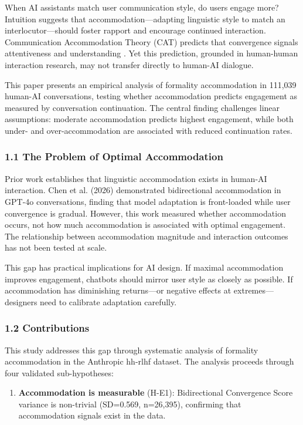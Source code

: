 
When AI assistants match user communication style, do users engage more? Intuition suggests that accommodation---adapting linguistic style to match an interlocutor---should foster rapport and encourage continued interaction. Communication Accommodation Theory (CAT) predicts that convergence signals attentiveness and understanding \citep{giles1973accommodation}. Yet this prediction, grounded in human-human interaction research, may not transfer directly to human-AI dialogue.

This paper presents an empirical analysis of formality accommodation in 111,039 human-AI conversations, testing whether accommodation predicts engagement as measured by conversation continuation. The central finding challenges linear assumptions: moderate accommodation predicts highest engagement, while both under- and over-accommodation are associated with reduced continuation rates.

\subsubsection{1.1 The Problem of Optimal Accommodation}

Prior work establishes that linguistic accommodation exists in human-AI interaction. Chen et al. (2026) demonstrated bidirectional accommodation in GPT-4o conversations, finding that model adaptation is front-loaded while user convergence is gradual. However, this work measured whether accommodation occurs, not how much accommodation is associated with optimal engagement. The relationship between accommodation magnitude and interaction outcomes has not been tested at scale.

This gap has practical implications for AI design. If maximal accommodation improves engagement, chatbots should mirror user style as closely as possible. If accommodation has diminishing returns---or negative effects at extremes---designers need to calibrate adaptation carefully.

\subsubsection{1.2 Contributions}

This study addresses this gap through systematic analysis of formality accommodation in the Anthropic hh-rlhf dataset. The analysis proceeds through four validated sub-hypotheses:

\begin{enumerate}
\item \textbf{Accommodation is measurable} (H-E1): Bidirectional Convergence Score variance is non-trivial (SD=0.569, n=26,395), confirming that accommodation signals exist in the data.
\end{enumerate}

